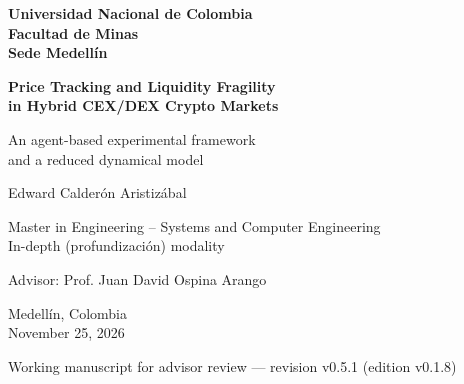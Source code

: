 \documentclass[11pt,letterpaper]{report}
\newcommand{\versionTesis}{v0.1.8}
\newcommand{\revisionManuscrito}{v0.5.1}
\numberwithin{equation}{chapter}
\begin{document}
\begin{titlepage}
  \thispagestyle{empty}
  \centering
  \singlespacing
  {\large\bfseries Universidad Nacional de Colombia\\[2pt]
  Facultad de Minas\\[2pt]
  Sede Medellín\par}
  \vspace{3.2cm}
  {\LARGE\bfseries Price Tracking and Liquidity Fragility\\
  in Hybrid CEX/DEX Crypto Markets\par}
  \vspace{0.9cm}
  {\Large An agent-based experimental framework\\
  and a reduced dynamical model\par}
  \vspace{2.6cm}
  {\Large Edward Calderón Aristizábal\par}
  \vspace{1.6cm}
  {\large Master in Engineering -- Systems and Computer Engineering\\[2pt]
  In-depth (profundización) modality\par}
  \vspace{0.8cm}
  {\large Advisor: Prof. Juan David Ospina Arango\par}
  \vfill
  {\large Medellín, Colombia\\[2pt]
  November 25, 2026\par}
  \vspace{0.3cm}
  {\small Working manuscript for advisor review --- revision \revisionManuscrito{} (edition \versionTesis{})\par}
\end{titlepage}

\setcounter{page}{1}

\begingroup
\setcounter{secnumdepth}{-1}
\titleformat{\section}{\Large\bfseries}{}{0pt}{}
\singlespacing

\clearpage

\endgroup
\setcounter{secnumdepth}{2}
\end{document}
